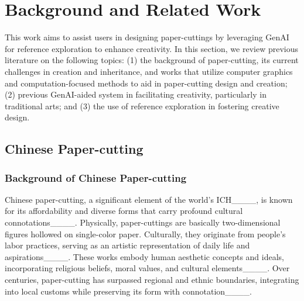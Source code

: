\section{Background and Related Work}
This work aims to assist users in designing paper-cuttings by leveraging GenAI for reference exploration to enhance creativity. In this section, we review previous literature on the following topics: (1) the background of paper-cutting, its current challenges in creation and inheritance, and works that utilize computer graphics and computation-focused methods to aid in paper-cutting design and creation; (2) previous GenAI-aided system in facilitating creativity, particularly in traditional arts; and (3) the use of reference exploration in fostering creative design.

\subsection{Chinese Paper-cutting}

\subsubsection{Background of Chinese Paper-cutting}

Chinese paper-cutting, a significant element of the world's ICH____, is known for its affordability and diverse forms that carry profound cultural connotations____. Physically, paper-cuttings are basically two-dimensional figures hollowed on single-color paper. Culturally, they originate from people's labor practices, serving as an artistic representation of daily life and aspirations____. These works embody human aesthetic concepts and ideals, incorporating religious beliefs, moral values, and cultural elements____.
Over centuries, paper-cutting has surpassed regional and ethnic boundaries, integrating into local customs while preserving its form with connotation____. 


